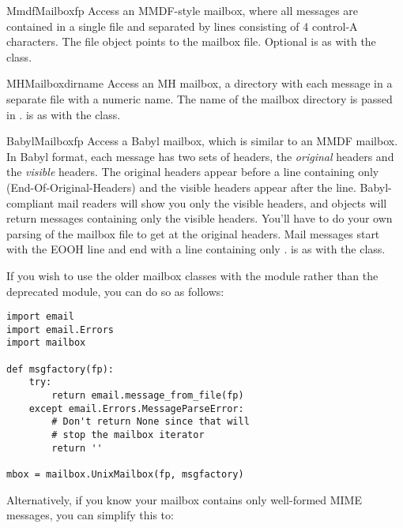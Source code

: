 \begin{classdesc}{MmdfMailbox}{fp}
Access an MMDF-style mailbox, where all messages are contained
in a single file and separated by lines consisting of 4 control-A
characters.  The file object  points to the mailbox file.
Optional  is as with the  class.
\end{classdesc}

\begin{classdesc}{MHMailbox}{dirname}
Access an MH mailbox, a directory with each message in a separate
file with a numeric name.
The name of the mailbox directory is passed in .
 is as with the  class.
\end{classdesc}

\begin{classdesc}{BabylMailbox}{fp}
Access a Babyl mailbox, which is similar to an MMDF mailbox.  In
Babyl format, each message has two sets of headers, the
\emph{original} headers and the \emph{visible} headers.  The original
headers appear before a line containing only 
(End-Of-Original-Headers) and the visible headers appear after the
 line.  Babyl-compliant mail readers will show you only the
visible headers, and  objects will return messages
containing only the visible headers.  You'll have to do your own
parsing of the mailbox file to get at the original headers.  Mail
messages start with the EOOH line and end with a line containing only
.   is as with the
 class.
\end{classdesc}

If you wish to use the older mailbox classes with the  module
rather than the deprecated  module, you can do so as follows:

\begin{verbatim}
import email
import email.Errors
import mailbox

def msgfactory(fp):
    try:
        return email.message_from_file(fp)
    except email.Errors.MessageParseError:
        # Don't return None since that will
        # stop the mailbox iterator
        return ''

mbox = mailbox.UnixMailbox(fp, msgfactory)
\end{verbatim}

Alternatively, if you know your mailbox contains only well-formed MIME
messages, you can simplify this to:

